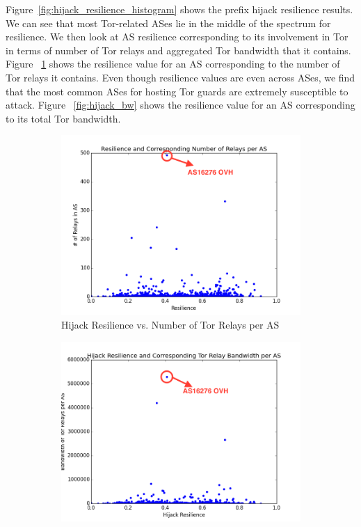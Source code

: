 Figure~\ref{fig:hijack_resilience_histogram} shows the prefix hijack resilience results. We can see that most Tor-related ASes lie in the middle of the spectrum for resilience. We then look at AS resilience corresponding to its involvement in Tor in terms of number of Tor relays and aggregated Tor bandwidth that it contains. Figure ~\ref{fig:res_relays} shows the resilience value for an AS corresponding to the number of Tor relays it contains. Even though resilience values are even across ASes, we find that the most common ASes for hosting Tor guards are extremely susceptible to attack. Figure ~\ref{fig:hijack_bw} shows the resilience value for an AS corresponding to its total Tor bandwidth. 

\begin{figure}[ht!]
\centering
\begin{subfigure}{.25\textwidth}
  \centering
  \includegraphics[width=\linewidth]{new_resilience_per_as}
  \caption{Hijack Resilience vs. Number of Tor Relays per AS}
  \label{fig:res_relays}
\end{subfigure}%
\begin{subfigure}{.25\textwidth}
  \centering
  \includegraphics[width=\linewidth]{new_bandwidth}

\end{subfigure}
\end{figure}
